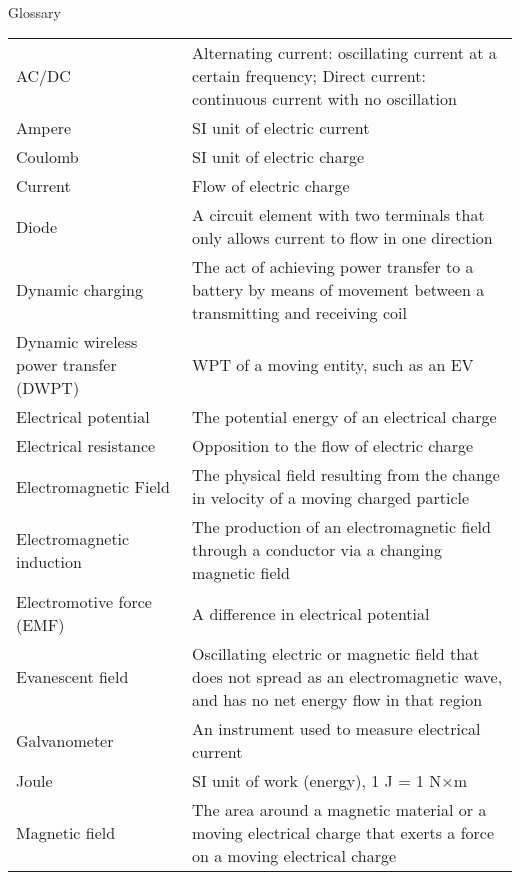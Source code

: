 

\renewcommand{\baselinestretch}{1}
\small\normalsize
\hbox{\ }

\vspace{.5in}

\begin{center}
\large{Glossary}
\end{center} 

\vspace{3pt}

\begin{supertabular}{p{0.2\textwidth}p{0.7\textwidth}}
AC/DC & Alternating current: oscillating current at a certain frequency; Direct current: continuous current with no oscillation \\
Ampere & SI unit of electric current \\
Coulomb & SI unit of electric charge \\
Current & Flow of electric charge \\
Diode & A circuit element with two terminals that only allows current to flow in one direction \\
Dynamic charging & The act of achieving power transfer to a battery by means of movement between a transmitting and receiving coil \\
Dynamic wireless power transfer (DWPT) & WPT of a moving entity, such as an EV \\
Electrical potential & The potential energy of an electrical charge \\
Electrical resistance & Opposition to the flow of electric charge \\
Electromagnetic Field & The physical field resulting from the change in velocity of a moving charged particle \\
Electromagnetic induction & The production of an electromagnetic field through a conductor via a changing magnetic field \\
Electromotive force (EMF) & A difference in electrical potential \\
Evanescent field & Oscillating electric or magnetic field that does not spread as an electromagnetic wave, and has no net energy flow in that region \\
Galvanometer & An instrument used to measure electrical current \\
Joule & SI unit of work (energy), 1 J = 1 N×m \\
Magnetic field & The area around a magnetic material or a moving electrical charge that exerts a force on a moving electrical charge \\

\end{supertabular}
